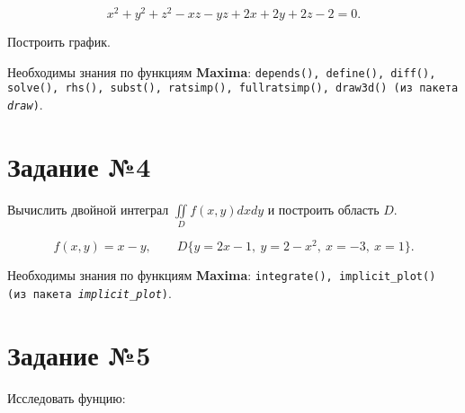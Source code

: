 	\[
		x^{2} + y^{2} + z^{2} - x z - y z + 2 x + 2 y + 2 z - 2 = 0.
	\]

	Построить график.

	Необходимы знания по функциям \textbf{Maxima}: {\tt depends(), define(), diff(), solve(), rhs(), subst(), ratsimp(), fullratsimp(), draw3d() (из пакета \textit{draw})}.

\section*{Задание №4}

    Вычислить двойной интеграл $\iint\limits_{D} f(x,y) dx dy$ и построить область $D$.

    \[
        f(x,y) = x - y, \qquad D \{ y = 2 x - 1, \: y = 2 - x^{2}, \: x = -3, \: x = 1 \}.
    \]

    Необходимы знания по функциям \textbf{Maxima}: {\tt integrate(), implicit\_plot() (из пакета \textit{implicit\_plot})}.

%
%
%
%

\section*{Задание №5}

    Исследовать фунцию:

